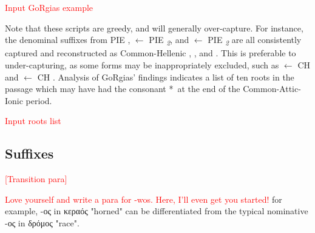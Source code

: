 \noindent\textcolor{red}{Input GoRgias example}


Note that these scripts are greedy, and will generally over-capture. For instance, the denominal suffixes  from PIE ,  $\gets$ PIE \textit{\textsubscript{2}}, and  $\gets$ PIE \textit{\textsubscript{2}} are all consistently captured and reconstructed as Common-Hellenic , , and . This is preferable to under-capturing, as some forms may be inappropriately excluded, such as  $\gets$ CH  and  $\gets$ CH  . Analysis of GoRgias' findings indicates a list of ten roots in the passage which may have had the consonant *\w\ at the end of the Common-Attic-Ionic period.

\noindent\textcolor{red}{Input roots list}


\subsection{Suffixes}

\noindent\textcolor{red}{[Transition para]}

\noindent\textcolor{red}{Love yourself and write a para for -wos. Here, I'll even get you started!}
for example, -ος in κεραός "horned" can be differentiated from the typical nominative -ος in δρόμος "race". 

%